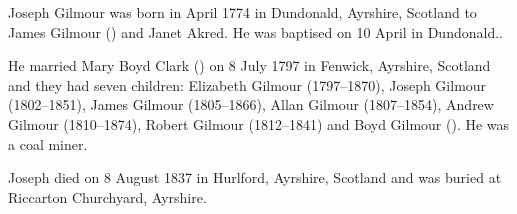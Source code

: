 
Joseph Gilmour was born in April 1774 in Dundonald, Ayrshire, Scotland to James Gilmour () and 
Janet Akred. He was baptised on 10 April in Dundonald.\cite{JosephGilmourBirth}.  

He married Mary Boyd Clark () on	8 July 1797 in Fenwick, Ayrshire, Scotland and they had seven children: Elizabeth Gilmour (1797--1870), Joseph Gilmour (1802--1851), James Gilmour (1805--1866), Allan Gilmour (1807--1854), Andrew Gilmour (1810--1874), Robert Gilmour (1812--1841) and Boyd Gilmour ().  He was a coal miner.

Joseph died on 8 August 1837 in Hurlford, Ayrshire, Scotland and was buried at Riccarton Churchyard, Ayrshire.\cite{JosephGilmourDeath}
